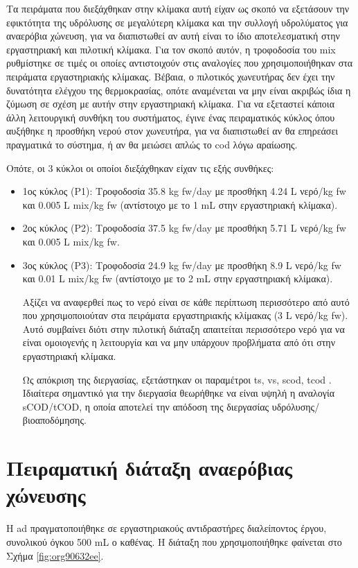 \documentclass[11pt]{report}
\begin{document}
Τα πειράματα που διεξάχθηκαν στην κλίμακα αυτή είχαν ως σκοπό να εξετάσουν την εφικτότητα της υδρόλυσης σε μεγαλύτερη κλίμακα και την συλλογή υδρολύματος για αναερόβια χώνευση, για να διαπιστωθεί αν αυτή είναι το ίδιο αποτελεσματική στην εργαστηριακή και πιλοτική κλίμακα. Για τον σκοπό αυτόν, η τροφοδοσία του \acrshort{mix} ρυθμίστηκε σε τιμές οι οποίες αντιστοιχούν στις αναλογίες που χρησιμοποιήθηκαν στα πειράματα εργαστηριακής κλίμακας. Βέβαια, ο πιλοτικός χωνευτήρας δεν έχει την δυνατότητα ελέγχου της θερμοκρασίας, οπότε αναμένεται να μην είναι ακριβώς ίδια η ζύμωση σε σχέση με αυτήν στην εργαστηριακή κλίμακα. Για να εξεταστεί κάποια άλλη λειτουργική συνθήκη του συστήματος, έγινε ένας πειραματικός κύκλος όπου αυξήθηκε η προσθήκη νερού στον χωνευτήρα, για να διαπιστωθεί αν θα επηρεάσει πραγματικά το σύστημα, ή αν θα μειώσει απλώς το \acrshort{cod} λόγω αραίωσης.

Οπότε, οι 3 κύκλοι οι οποίοι διεξάχθηκαν είχαν τις εξής συνθήκες:
\begin{itemize}
\item 1ος κύκλος (P1): Τροφοδοσία 35.8 kg \acrshort{fw}/day με προσθήκη 4.24 L νερό/kg \acrshort{fw} και 0.005 L \acrshort{mix}/kg \acrshort{fw} (αντίστοιχο με το 1 mL στην εργαστηριακή κλίμακα).
\item 2ος κύκλος (P2): Τροφοδοσία 37.5 kg \acrshort{fw}/day με προσθήκη 5.71 L νερό/kg \acrshort{fw} και 0.005 L \acrshort{mix}/kg \acrshort{fw}.
\item 3ος κύκλος (P3): Τροφοδοσία 24.9 kg \acrshort{fw}/day με προσθήκη 8.9 L νερό/kg \acrshort{fw} και 0.01 L \acrshort{mix}/kg \acrshort{fw} (αντίστοιχο με το 2 mL στην εργαστηριακή κλίμακα).

Αξίζει να αναφερθεί πως το νερό είναι σε κάθε περίπτωση περισσότερο από αυτό που χρησιμοποιούταν στα πειράματα εργαστηριακής κλίμακας (3 L νερό/kg \acrshort{fw}). Αυτό συμβαίνει διότι στην πιλοτική διάταξη απαιτείται περισσότερο νερό για να είναι ομοιογενής η λειτουργία και να μην υπάρχουν προβλήματα από ότι στην εργαστηριακή κλίμακα.

Ως απόκριση της διεργασίας, εξετάστηκαν οι παραμέτροι \acrshort{ts}, \acrshort{vs}, \acrshort{scod}, \acrshort{tcod} . Ιδιαίτερα σημαντικό για την διεργασία θεωρήθηκε να είναι υψηλή η αναλογία sCOD/tCOD, η οποία αποτελεί την απόδοση της διεργασίας υδρόλυσης/βιοαποδόμησης.
\end{itemize}

\section{Πειραματική διάταξη αναερόβιας χώνευσης}
\label{sec:orgef23456}
Η \acrshort{ad} πραγματοποιήθηκε σε εργαστηριακούς αντιδραστήρες διαλείποντος έργου, συνολικού όγκου 500 mL ο καθένας. Η διάταξη που χρησιμοποιήθηκε φαίνεται στο Σχήμα \ref{fig:org90632ee}.
\end{document}
